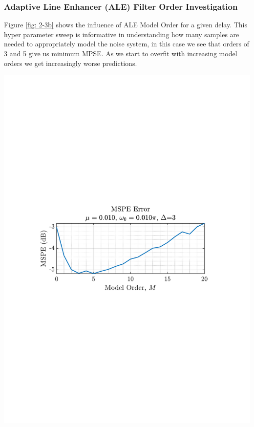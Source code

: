 \documentclass[12pt]{article}
\begin{document}
	\subsubsection{Adaptive Line Enhancer (ALE) Filter Order Investigation}
		\begin{minipage}[b]{0.49\textwidth}
			Figure \ref{fig: 2-3b} shows the influence of ALE Model Order for a given delay. This hyper parameter sweep is informative in understanding how many samples are needed to appropriately model the noise system, in this case we see that orders of 3 and 5 give us minimum MPSE. As we start to overfit with increasing model orders we get increasingly worse predictions.
		\end{minipage}%
		\begin{minipage}{0.04\textwidth}
			\hspace*{0.04\textwidth}
		\end{minipage}%
		\begin{minipage}[t]{0.49\textwidth}
			\centering
			\includegraphics[trim={2.2cm 11.2cm 3.15cm  11.2cm}, clip, width=\textwidth]{../MATLAB/figures/q2_3b_fig03.pdf} 
			\captionsetup{justification=centering}
			\label{fig: 2-3b}
		\end{minipage}%
		
\end{document}
